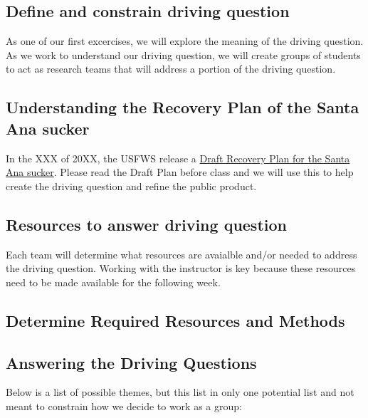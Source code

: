 \documentclass{article}\usepackage[]{graphicx}\usepackage[]{color}
\begin{document}
\subsection{Define and constrain driving question}

As one of our first excercises, we will explore the meaning of the driving question. As we work to understand our driving question, we will create groups of students to act as research teams that will address a portion of the driving question.

\subsection{Understanding the Recovery Plan of the Santa Ana sucker}

In the XXX of 20XX, the USFWS release a \href{https://www.fws.gov/carlsbad/SpeciesStatusList/RP/201411xx_Draft%20RP_SASU.pdf}{Draft Recovery Plan for the Santa Ana sucker}. Please read the Draft Plan before class and we will use this to help create the driving question and refine the public product. 

\subsection{Resources to answer driving question}

Each team will determine what resources are avaialble and/or needed to address the driving question. Working with the instructor is key because these resources need to be made available for the following week.

\subsection{Determine Required Resources and Methods}


\subsection{Answering the Driving Questions}




Below is a list of possible themes, but this list in only one potential list and not meant to constrain how we decide to work as a group: 
\end{document}
